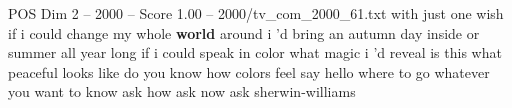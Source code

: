 \begin{textsample}{POS Dim 2 – 2000 – Score 1.00 – 2000/tv\_com\_2000\_61.txt}  \label{ex:f2_pos_087}
with just one wish if i could change my whole \textbf{world} around i 'd bring an autumn day inside or summer all year long if i could speak in color what magic i 'd reveal is this what peaceful looks like do you know how colors feel say hello where to go whatever you want to know ask how ask now ask sherwin-williams

\end{textsample}
